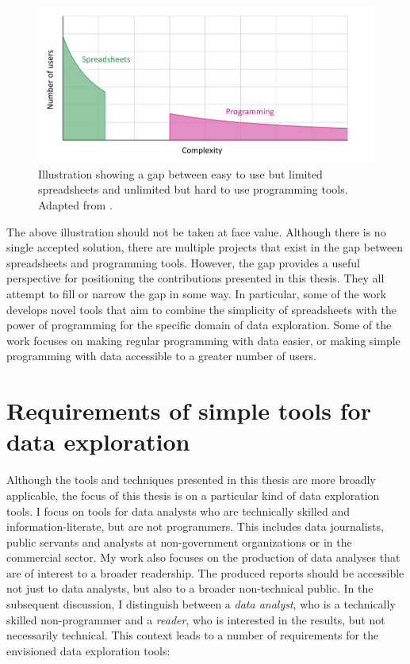 \documentclass[fleqn,11pt]{report}
\begin{document}
\begin{figure}[h!]
\centering
\vspace{0.5em}
  \caption{Illustration showing a gap between easy to use but limited spreadsheets
  and unlimited but hard to use programming tools. Adapted from \citet{edwards-2015-transcript}.}
\label{fig:gap}
\vspace{-0.5em}
\includegraphics[scale=0.25]{img/gap.png}
\end{figure}

The above illustration should not be taken at face value. Although there is no single accepted
solution, there are multiple projects that exist in the gap between spreadsheets and programming
tools. However, the gap provides a useful perspective for positioning the contributions presented
in this thesis. They all attempt to fill or narrow the gap in some way. In particular, some
of the work develops novel tools that aim to combine the simplicity of spreadsheets
with the power of programming for the specific domain of data exploration. Some of the work
focuses on making regular programming with data easier, or making simple programming with data
accessible to a greater number of users.

\section{Requirements of simple tools for data exploration}

Although the tools and techniques presented in this thesis are more broadly applicable,
the focus of this thesis is on a particular kind of data exploration tools. I focus on tools
for data analysts who are technically skilled and information-literate, but are not programmers.
This includes data journalists, public servants and analysts at non-government organizations or
in the commercial sector. My work also focuses on the production of data analyses that are of
interest to a broader readership. The produced reports should be accessible not just to 
data analysts, but also to a broader non-technical public.
%
In the subsequent discussion, I distinguish between a \emph{data analyst}, who is a
technically skilled non-programmer and a \emph{reader}, who is interested in the results, but not
necessarily technical. This context leads to a number of requirements for the envisioned data
exploration tools:
\end{document}
